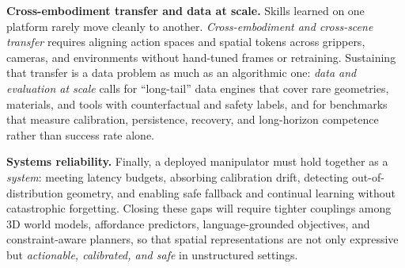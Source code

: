 \textbf{Cross-embodiment transfer and data at scale.} Skills learned on one platform rarely move cleanly to another. \emph{Cross-embodiment and cross-scene transfer} requires aligning action spaces and spatial tokens across grippers, cameras, and environments without hand-tuned frames or retraining. Sustaining that transfer is a data problem as much as an algorithmic one: \emph{data and evaluation at scale} calls for ``long-tail'' data engines that cover rare geometries, materials, and tools with counterfactual and safety labels, and for benchmarks that measure calibration, persistence, recovery, and long-horizon competence rather than success rate alone.

\textbf{Systems reliability.} Finally, a deployed manipulator must hold together as a \emph{system}: meeting latency budgets, absorbing calibration drift, detecting out-of-distribution geometry, and enabling safe fallback and continual learning without catastrophic forgetting. Closing these gaps will require tighter couplings among 3D world models, affordance predictors, language-grounded objectives, and constraint-aware planners, so that spatial representations are not only expressive but \emph{actionable, calibrated, and safe} in unstructured settings.
